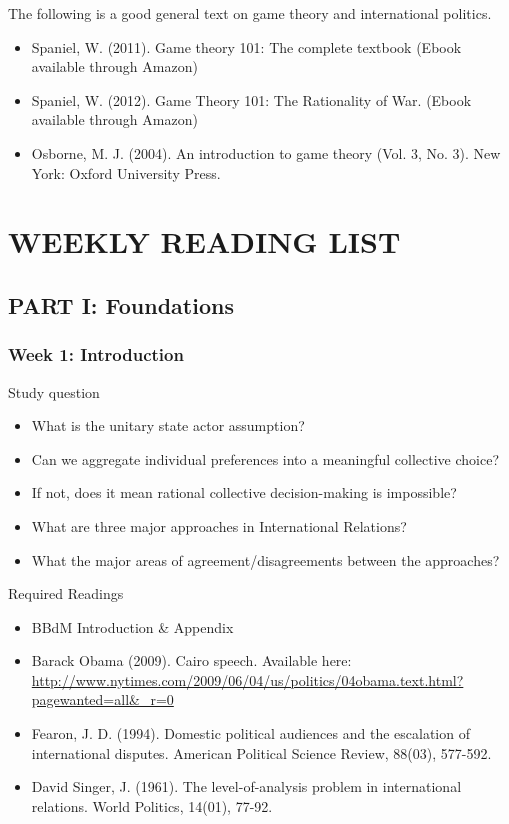 \documentclass[12pt,a4paper]{article}
\begin{document}
The following is a good general text on game theory and international politics.

\begin{itemize}
  \item Spaniel, W. (2011). Game theory 101: The complete textbook (Ebook available through Amazon)
	\item Spaniel, W. (2012). Game Theory 101: The Rationality of War. (Ebook available through Amazon)
	\item Osborne, M. J. (2004). An introduction to game theory (Vol. 3, No. 3). New York: Oxford University Press.
\end{itemize}

\section*{WEEKLY READING LIST}

\subsection*{PART I: Foundations}

\subsubsection*{Week 1: Introduction}

Study question

\begin{itemize}
	\item What is the unitary state actor assumption? 
	\item Can we aggregate individual preferences into a meaningful collective choice? 
	\item If not, does it mean rational collective decision-making is impossible? 
	\item What are three major approaches in International Relations? 
	\item What the major areas of agreement/disagreements between the approaches? 
	
\end{itemize}

\noindent Required Readings

\begin{itemize}
	\item BBdM Introduction \& Appendix
	\item Barack Obama (2009). Cairo speech. Available here: \url{http://www.nytimes.com/2009/06/04/us/politics/04obama.text.html?pagewanted=all&_r=0}
	\item Fearon, J. D. (1994). Domestic political audiences and the escalation of international disputes. American Political Science Review, 88(03), 577-592.
	\item David Singer, J. (1961). The level-of-analysis problem in international relations. World Politics, 14(01), 77-92.
\end{itemize}
\end{document}

